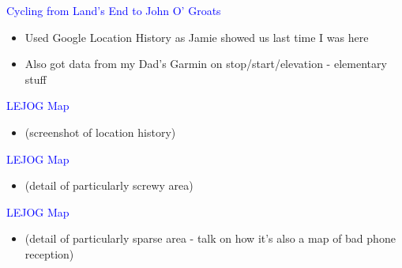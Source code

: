 \documentclass[landscape]{slides}
\begin{document}


\begin{slide}

    \textcolor{blue}{\Large{Cycling from Land's End to John O' Groats}}

    \begin{itemize}
        \item Used Google Location History as Jamie showed us last time I was here
        \item Also got data from my Dad's Garmin on stop/start/elevation - elementary stuff
    \end{itemize}



\end{slide}


\begin{slide}

    \textcolor{blue}{\Large{LEJOG Map}}

    \begin{itemize}
        \item (screenshot of location history)
    \end{itemize}

\end{slide}


\begin{slide}

    \textcolor{blue}{\Large{LEJOG Map}}

    \begin{itemize}
        \item (detail of particularly screwy area)
    \end{itemize}

\end{slide}



\begin{slide}

    \textcolor{blue}{\Large{LEJOG Map}}

    \begin{itemize}
        \item (detail of particularly sparse area - talk on how it's also a map of bad phone reception)
    \end{itemize}


\end{slide}
\end{document}

